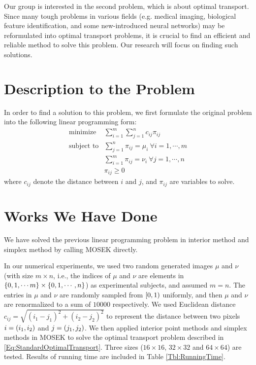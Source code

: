 \documentclass[english]{pkupaper}
\title{\titlemark}
\author{\authoring}
\begin{document}
\maketitle

Our group is interested in the second problem, which is about optimal transport. Since many tough problems in various fields (e.g. medical imaging, biological feature identification, and some new-introduced neural networks) may be reformulated into optimal transport problems, it is crucial to find an efficient and reliable method to solve this problem. Our research will focus on finding such solutions.

\section{Description to the Problem}

In order to find a solution to this problem, we first formulate the original problem into the following linear programming form:
\begin{equation} \label{Eq:StandardOptimalTransport}
\begin{array}{rl}
	\text{minimize} & \displaystyle\sum_{i=1}^m\sum_{j=1}^n c_{ij}\pi_{ij}\\
	\text{subject to} & \displaystyle\sum_{j=1}^n\pi_{ij}=\mu_i\ \forall i=1,\cdots,m\\
	& \displaystyle\sum_{i=1}^m\pi_{ij}=\nu_i\ \forall j=1,\cdots,n\\
	& \displaystyle\pi_{ij}\ge 0
\end{array}
\end{equation}
where $c_{ij}$ denote the distance between $i$ and $j$, and $\pi_{ij}$ are variables to solve.

\section{Works We Have Done}

We have solved the previous linear programming problem in interior method and simplex method by calling MOSEK directly.
 
In our numerical experiments, we used two random generated images $\mu$ and $\nu$ (with size $m \times n$, i.e., the indices of $\mu$ and $\nu$ are elements in $\left\{  0, 1, \cdots m \right\} \times \left\{  0, 1, \cdots, n  \right\}$) as experimental subjects, and assumed $m=n$. The entries in $\mu$ and $\nu$ are randomly sampled from $\left[  0, 1  \right)$ uniformly, and then $\mu$ and $\nu$ are renormalized to a sum of $10000$ respectively. We used Euclidean distance $c_{ij}=\sqrt{(i_1-j_1)^2+(i_2-j_2)^2}$ to represent the distance between two pixels $i = \left(  i_1, i_2  \right)$ and $j = \left(  j_1, j_2  \right)$. We then applied interior point methods and simplex methods in MOSEK to solve the optimal transport problem described in \eqref{Eq:StandardOptimalTransport}. Three sizes ($16\times 16$, $32\times 32$ and $64\times 64$) are tested. Results of running time are included in Table \ref{Tbl:RunningTime}.
\end{document}
